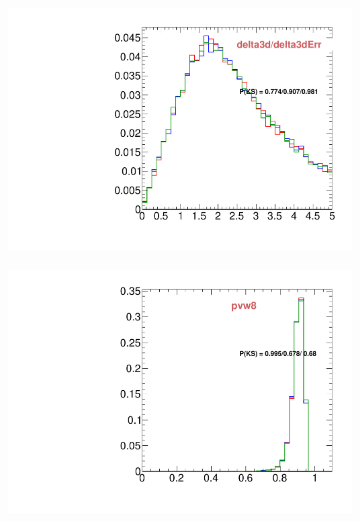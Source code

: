\begin{figure}
\begin{subfigure}[b]{0.2\textwidth}
                \includegraphics[width=\textwidth]{Figures/VariablesComparison/Data_endcaps_figs_3h/delta3dErr}
                \label{fig:Data_endcaps_delta3d/delta3dErr_3h}
        \end{subfigure}
        \begin{subfigure}[b]{0.2\textwidth}
                \centering
                \includegraphics[width=\textwidth]{Figures/VariablesComparison/Data_endcaps_figs_3h/pvw8}
                \label{fig:Data_endcaps_pvw8_3h}
        \end{subfigure}
        \begin{subfigure}[b]{0.2\textwidth}
                \centering

\end{subfigure}
\end{figure}
